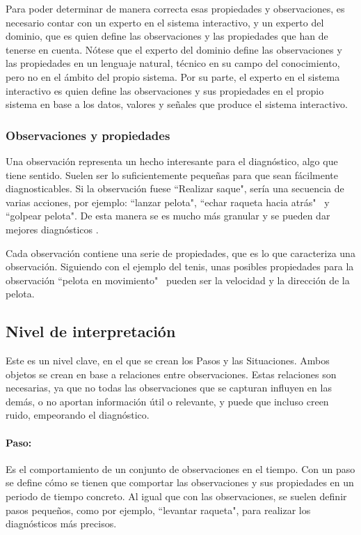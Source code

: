 Para poder determinar de manera correcta esas propiedades y observaciones, es necesario contar con un 
experto en el sistema interactivo, y un experto del dominio, que es quien define las observaciones y las
propiedades que han de tenerse en cuenta. N\'otese que el experto del dominio define las observaciones y las
propiedades en un lenguaje natural, t\'ecnico en su campo del conocimiento, pero no en el \'ambito del propio
sistema. Por su parte, el experto en el sistema interactivo es quien define
las observaciones y sus propiedades en el propio sistema
en base a los datos, valores y se\~nales que produce el sistema interactivo.

\subsubsection{Observaciones y propiedades}
Una observaci\'on representa un hecho interesante para el diagn\'ostico, algo que tiene sentido. Suelen
ser lo suficientemente peque\~nas para que sean f\'acilmente diagnosticables. Si la observaci\'on
fuese ``Realizar saque", ser\'ia una secuencia de varias acciones, por ejemplo: ``lanzar pelota", ``echar raqueta hacia atr\'as" \
y ``golpear pelota". De esta manera se es mucho m\'as granular y se pueden dar mejores diagn\'osticos \cite{INTRASIM:Manual}.

Cada observaci\'on contiene una serie de propiedades, que es lo que caracteriza una observaci\'on. 
Siguiendo con el ejemplo del tenis, unas posibles propiedades para la observaci\'on ``pelota en movimiento" \
pueden ser la velocidad y la direcci\'on de la pelota.

\subsection{Nivel de interpretaci\'on}
Este es un nivel clave, en el que se crean los Pasos y las Situaciones. Ambos objetos se crean en base a relaciones
entre observaciones.
Estas relaciones son necesarias, ya que no todas las observaciones que se capturan influyen en las dem\'as,
o no aportan informaci\'on \'util o relevante, y puede que incluso creen ruido, empeorando el diagn\'ostico.

\paragraph{\textbf{Paso:}}
Es el comportamiento de un conjunto de observaciones en el tiempo. Con un paso se define 
c\'omo se tienen
que comportar las observaciones y sus propiedades en un periodo de tiempo concreto. Al igual que con las observaciones,
se suelen definir pasos peque\~nos, como por ejemplo, ``levantar raqueta", para realizar los diagn\'osticos m\'as precisos.

